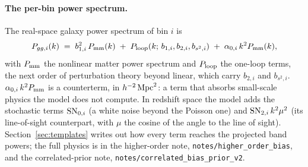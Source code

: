 \documentclass[11pt]{article}
\newcommand{\SNzi}{{\rm SN}_{0,i}}
\newcommand{\SNti}{{\rm SN}_{2,i}}
\newcommand{\us}{\_\allowbreak}
\begin{document}
\paragraph{The per-bin power spectrum.}
The real-space galaxy power spectrum of bin $i$ is
\begin{equation}
  P_{gg,i}(k) \;=\; b_{1,i}^2\,P_{\rm mm}(k)
  \;+\; P_{\rm loop}(k;\, b_{1,i}, b_{2,i}, b_{s^2,i})
  \;+\; \alpha_{0,i}\,k^2 P_{\rm mm}(k) ,
  \label{eq:pgg}
\end{equation}
with $P_{\rm mm}$ the nonlinear matter power spectrum and
$P_{\rm loop}$ the one-loop terms, the next order of perturbation
theory beyond linear, which carry $b_{2,i}$ and $b_{s^2,i}$.
$\alpha_{0,i}\,k^2 P_{\rm mm}$ is a counterterm, in
$h^{-2}\,{\rm Mpc}^2$: a term that absorbs small-scale physics the
model does not compute.  In redshift space the model adds the
stochastic terms $\SNzi$ (a white noise beyond the Poisson one) and
$\SNti\,k^2\mu^2$ (its line-of-sight counterpart, with $\mu$ the
cosine of the angle to the line of sight).
Section~\ref{sec:templates} writes out how every term
reaches the projected band powers; the full physics is in the
higher-order note, \texttt{notes/higher\us order\us bias}, and the
correlated-prior note,
\texttt{notes/correlated\us bias\us prior\us v2}.
\end{document}

